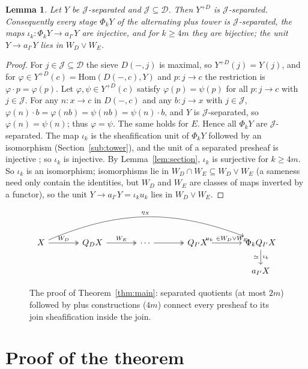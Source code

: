 \documentclass[11pt]{amsart}
\newtheorem{lem}[thm]{Lemma}
\theoremstyle{definition}
\newcommand{\Hom}{\mathrm{Hom}}
\newcommand{\sD}{\mathcal D}
\newcommand{\sJ}{\mathcal J}
\begin{document}
\begin{lem}\label{lem:plus}
Let $Y$ be $\sJ$-separated and $\sJ\subseteq\sD$. Then $Y^{+D}$ is
$\sJ$-separated. Consequently every stage $\Phi_kY$ of the alternating plus
tower is $\sJ$-separated, the maps $\iota_k\colon\Phi_kY\to a_{I'}Y$ are
injective, and for $k\ge4m$ they are bijective; the unit $Y\to a_{I'}Y$ lies
in $W_D\vee W_E$.
\end{lem}
\begin{proof}
For $j\in\sJ\subseteq\sD$ the sieve $D(-,j)$ is maximal, so $Y^{+D}(j)=Y(j)$,
and for $\varphi\in Y^{+D}(c)=\Hom(D(-,c),Y)$ and $p\colon j\to c$ the
restriction is $\varphi\cdot p=\varphi(p)$. Let $\varphi,\psi\in Y^{+D}(c)$
satisfy $\varphi(p)=\psi(p)$ for all $p\colon j\to c$ with $j\in\sJ$. For any
$n\colon x\to c$ in $D(-,c)$ and any $b\colon j\to x$ with $j\in\sJ$,
$\varphi(n)\cdot b=\varphi(nb)=\psi(nb)=\psi(n)\cdot b$, and $Y$ is
$\sJ$-separated, so $\varphi(n)=\psi(n)$; thus $\varphi=\psi$. The same holds
for $E$. Hence all $\Phi_kY$ are $\sJ$-separated. The map $\iota_k$ is the
sheafification unit of $\Phi_kY$ followed by an isomorphism
(Section~\ref{sub:tower}), and the unit of a separated presheaf is injective
\cite[III.5]{MLM}; so $\iota_k$ is injective. By Lemma~\ref{lem:section},
$\iota_k$ is surjective for $k\ge4m$. So $\iota_k$ is an isomorphism; isomorphisms lie in
$W_D\cap W_E\subseteq W_D\vee W_E$ (a sameness need only contain the
identities, but $W_D$ and $W_E$ are classes of maps inverted by a functor), so
the unit $Y\to a_{I'}Y=\iota_ku_k$ lies in $W_D\vee W_E$.
\end{proof}

\begin{figure}[ht]
\[
\begin{tikzcd}[column sep=large]
X\arrow[r,"W_D",two heads]\arrow[rrrr,bend left=22,"\eta_X"] & Q_DX\arrow[r,"W_E",two heads] & \cdots\arrow[r,two heads] & Q_{I'}X\arrow[r,"u_k\ \in W_D\vee W_E"] & \Phi_kQ_{I'}X\arrow[d,"\iota_k","\simeq"']\\
& & & & a_{I'}X
\end{tikzcd}
\]
\caption{The proof of Theorem~\ref{thm:main}: separated quotients (at most $2m$)
followed by plus constructions ($4m$) connect every presheaf to its join
sheafification inside the join.}
\end{figure}

\section{Proof of the theorem}\label{sec:proof}
\end{document}
